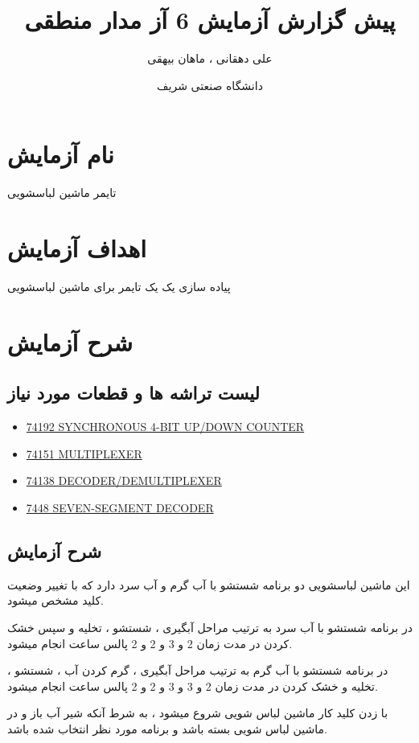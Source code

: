 \documentclass[twoside]{article}
\title{\Huge پیش گزارش آزمایش 6 آز مدار منطقی }
\author{\Large علی دهقانی ، ماهان بیهقی}
\date{دانشگاه صنعتی شریف}
\begin{document}
	\maketitle
	\newpage
	\section*{نام آزمایش}
	تایمر ماشین لباسشویی
	
	\section*{اهداف آزمایش}
	پیاده سازی یک یک تایمر برای ماشین لباسشویی
	
	\section*{شرح آزمایش}
	
	\subsection*{لیست تراشه ها و قطعات مورد نیاز} 
	\begin{itemize}
		\item
		\href{https://datasheetspdf.com/pdf-file/248168/STMicroelectronics/74192/1}{74192 SYNCHRONOUS 4-BIT UP/DOWN COUNTER}
		\item
		\href{https://www.esi.uclm.es/www/isanchez/apuntes/ci/74151.pdf}{74151 MULTIPLEXER}
		\item
		\href{https://www.ti.com/lit/ds/symlink/sn74ls138.pdf}{74138 DECODER/DEMULTIPLEXER}
		\item
		\href{https://www.rhydolabz.com/documents/74LS48.pdf}{7448 SEVEN-SEGMENT DECODER}
	\end{itemize}
	
	\subsection*{شرح آزمایش}
	این ماشین لباسشویی دو برنامه شستشو با آب گرم و آب سرد دارد که با تغییر وضعیت کلید مشخص میشود. 
	
	در برنامه شستشو با آب سرد به ترتیب مراحل آبگیری ، شستشو ، تخلیه و سپس خشک کردن در مدت زمان 2 و 3 و 2 و 2 پالس ساعت انجام میشود.
	
	در برنامه شستشو با آب گرم به ترتیب مراحل آبگیری ، گرم کردن آب ، شستشو ، تخلیه و خشک کردن در مدت زمان 2 و 3 و 3 و 2 و 2 پالس ساعت انجام میشود.
	
	با زدن کلید کار ماشین لباس شویی شروع میشود ، به شرط آنکه شیر آب باز و در ماشین لباس شویی بسته باشد و برنامه مورد نظر انتخاب شده باشد.
	
\end{document}
